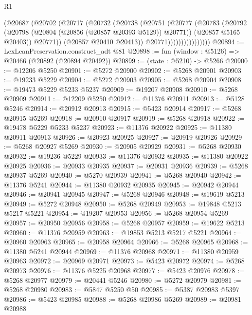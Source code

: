 \begin{lexlean}{R1}
\begin{coremodule}
                          (@20687
                            (@20702
                              (@20717
                                (@20732
                                  (@20738
                                    (@20751
                                      (@20777
                                        (@20783
                                          (@20792
                                            (@20798 (@20804 (@20856 (@20857 @20393 @5129)) @20771))
                                            (@20857 @5165 @20403))
                                          @20771))
                                      (@20857 @20410 @20413))
                                    @20771))))))))))))))))
@20894 := LexLeanPreservation.construct_adt @81
@20898 := fun (window : @5126) => @20466 (@20892 (@20894 @20492))
@20899 := (state : @5210) -> @5266
@20900 := @12206 @5250
@20901 := @5272 @20900
@20902 := @5268 @20901
@20903 := @19233 @5229
@20904 := @5272 @20903
@20905 := @5268 @20904
@20908 := @19473 @5229 @5233 @5237
@20909 := @19207 @20908
@20910 := @5268 @20909
@20911 := @12209 @5250
@20912 := @11376 @20911
@20913 := @5128 @5246
@20914 := @20912 @20913
@20915 := @5423 @20914
@20917 := @5268 @20915 @5269
@20918 := @20910 @20917
@20919 := @5268 @20918
@20922 := @19478 @5229 @5233 @5237
@20923 := @11376 @20922
@20925 := @11380 @20911 @20913
@20926 := @20923 @20925
@20927 := @20919 @20926
@20929 := @5268 @20927 @5269
@20930 := @20905 @20929
@20931 := @5268 @20930
@20932 := @19236 @5229
@20933 := @11376 @20932
@20935 := @11380 @20922 @20925
@20936 := @20933 @20935
@20937 := @20931 @20936
@20939 := @5268 @20937 @5269
@20940 := @5270 @20939
@20941 := @5268 @20940
@20942 := @11376 @5241
@20944 := @11380 @20932 @20935
@20945 := @20942 @20944
@20946 := @20941 @20945
@20947 := @5268 @20946
@20948 := @19619 @5213
@20949 := @5272 @20948
@20950 := @5268 @20949
@20953 := @19848 @5213 @5217 @5221
@20954 := @19207 @20953
@20956 := @5268 @20954 @5269
@20957 := @20950 @20956
@20958 := @5268 @20957
@20959 := @19622 @5213
@20960 := @11376 @20959
@20963 := @19853 @5213 @5217 @5221
@20964 := @20960 @20963
@20965 := @20958 @20964
@20966 := @5268 @20965
@20968 := @11380 @5241 @20944
@20969 := @11376 @20968
@20971 := @11380 @20959 @20963
@20972 := @20969 @20971
@20973 := @5423 @20972
@20974 := @5268 @20973
@20976 := @11376 @5225 @20968
@20977 := @5423 @20976
@20978 := @5268 @20977
@20979 := @20441 @5246
@20980 := @5272 @20979
@20981 := @5268 @20980
@20983 := @5847 @5250 @50
@20985 := @5387 @20983 @5397
@20986 := @5423 @20985
@20988 := @5268 @20986 @5269
@20989 := @20981 @20988

\end{coremodule}
\end{lexlean}

